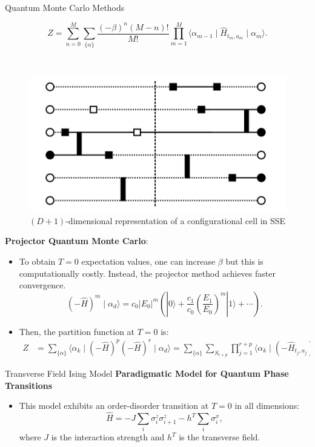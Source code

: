\documentclass[final,hyperref={pdfpagelabels=false}]{beamer}
\begin{document}
\begin{frame}[t]
\begin{columns}[t]
\begin{column}{.48\textwidth}
\begin{block}{Quantum Monte Carlo Methods}
\begin{itemize}
\begin{equation}
     Z = \sum_{n = 0}^{M} \sum_{\{\alpha\}} \frac{(-\beta)^n (M - n)!}{M!} \prod_{m = 1}^M \langle \alpha_{m-1} \mid \hat{H}_{t_m, a_m} \mid \alpha_{m} \rangle . \label{eq:final_partition_function_sample}
\end{equation}
\end{itemize}
\text{ }\\
\begin{figure}
    \centering
    \includegraphics[width=0.6\linewidth]{2023-tiwari-espresso-summer-school-poster-session-pimd-main//figures/projector_image.pdf}
    \caption{$(D + 1)$-dimensional representation of a configurational cell in SSE}
\end{figure}
\textbf{Projector Quantum Monte Carlo}:
\begin{itemize}
\item To obtain $T = 0$ expectation values, one can increase $\beta$ but this is computationally costly. Instead, the projector method achieves faster convergence.
\begin{equation}
    \left( -\hat{H} \right)^m \mid \alpha_d \rangle = c_0 |E_0|^m \left( |0\rangle + \frac{c_1}{c_0} \left( \frac{E_1}{E_0} \right)^m |1\rangle + \cdots \right).
\end{equation}
\item Then, the partition function at $T = 0$ is:
\begin{align}
    Z &= \sum_{\{\alpha\}} \langle \alpha_k \mid (-\hat{H})^p(-\hat{H})^{r} \mid \alpha_d \rangle = \sum_{\{\alpha\}} \sum_{S_{r + p}} \prod_{j = 1}^{r + p}\langle \alpha_k \mid (-\hat{H}_{t_j, a_j}) \mid \alpha_d \rangle.    
\end{align}
\end{itemize}
\end{block}

\begin{block}{Transverse Field Ising Model}
\textbf{Paradigmatic Model for Quantum Phase Transitions}
\begin{itemize}
    \item This model exhibits an order-disorder transition at $T = 0$ in all dimensions:
    \begin{equation}
        \hat{H} = -J \sum_{i} \sigma_{i}^{z} \sigma_{i + 1}^{z} - h^T \sum_{i} \sigma_{i}^{x},  
        \label{eq:Hamiltonian_TFIM}
    \end{equation}
    where $J$ is the interaction strength and $h^T$ is the transverse field.  
\end{itemize}


\end{block}
\end{column}
\end{columns}
\end{frame}
\end{document}
